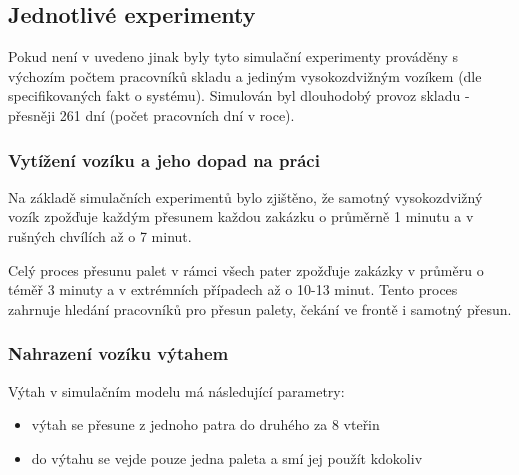 \documentclass[11pt]{article}
\begin{document}
	\subsection{Jednotlivé experimenty}
	Pokud není v uvedeno jinak byly tyto simulační experimenty prováděny s výchozím počtem pracovníků skladu a jediným vysokozdvižným vozíkem (dle specifikovaných fakt o systému). Simulován byl dlouhodobý provoz skladu - přesněji 261 dní (počet pracovních dní v roce).
	
	\subsubsection{Vytížení vozíku a jeho dopad na práci}
	Na základě simulačních experimentů bylo zjištěno, že samotný vysokozdvižný vozík zpožďuje každým přesunem každou zakázku o průměrně 1 minutu a v rušných chvílích až o 7 minut.
	
	Celý proces přesunu palet v rámci všech pater zpožďuje zakázky v průměru o téměř 3 minuty a v extrémních případech až o 10-13 minut. Tento proces zahrnuje hledání pracovníků pro přesun palety, čekání ve frontě i samotný přesun.
	
	
	\subsubsection{Nahrazení vozíku výtahem} \label{exp:vytah}
	Výtah v simulačním modelu má následující parametry:
	\begin{itemize}
		\item výtah se přesune z jednoho patra do druhého za 8 vteřin
		\item do výtahu se vejde pouze jedna paleta a smí jej použít kdokoliv
	\end{itemize}
\end{document}
